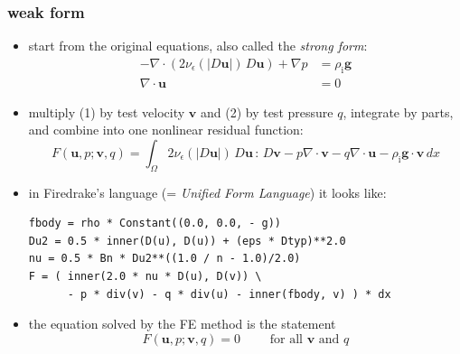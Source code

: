 \documentclass[10pt,
               hyperref={colorlinks,citecolor=DeepPink4,linkcolor=black,urlcolor=blue},
               svgnames]{beamer}
\newcommand{\bv}{\mathbf{v}}
\newcommand{\bu}{\mathbf{u}}
\newcommand{\Div}{\nabla\cdot}
\newcommand{\eps}{\epsilon}
\newcommand{\rhoi}{\rho_{\text{i}}}
\begin{document}
\begin{frame}[fragile]
\frametitle{weak form}

\begin{itemize}
\item start from the original equations, also called the \emph{strong form}:
\small
\begin{align}
- \nabla \cdot \left(2 \nu_\eps(|D\bu|)\, D\bu\right) + \nabla p &= \rhoi \mathbf{g} \\
\Div \bu &= 0
\end{align}
\normalsize
\item multiply (1) by test velocity $\bv$ and (2) by test pressure $q$, integrate by parts, and combine into one nonlinear residual function:
    $$F(\bu,p;\bv,q) = \int_{\Omega} 2 \nu_\eps(|D\bu|)\, D\bu\,:\,D\bv - p \nabla \cdot \bv - q \nabla \cdot \bu - \rhoi \mathbf{g} \cdot \bv \,dx$$
\item in Firedrake's language (= \emph{Unified Form Language}) it looks like:

\medskip
\begin{Verbatim}[fontsize=\small]
fbody = rho * Constant((0.0, 0.0, - g))
Du2 = 0.5 * inner(D(u), D(u)) + (eps * Dtyp)**2.0
nu = 0.5 * Bn * Du2**((1.0 / n - 1.0)/2.0)
F = ( inner(2.0 * nu * D(u), D(v)) \
      - p * div(v) - q * div(u) - inner(fbody, v) ) * dx
\end{Verbatim}

\medskip
\item the equation solved by the FE method is the statement
   $$F(\bu,p;\bv,q) = 0 \qquad \text{ for all } \bv \text{ and } q$$
\end{itemize}
\end{frame}
\end{document}
